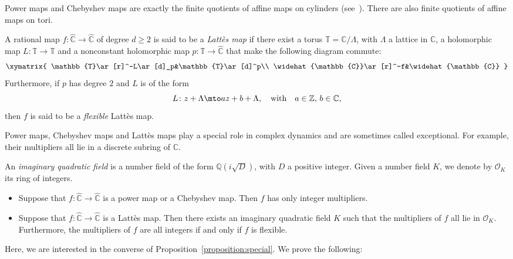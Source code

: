 Power maps and Chebyshev maps are exactly the finite quotients of affine maps on cylinders (see~\cite[Lem.\,3.8]{M2006}). There are also finite quotients of affine maps on tori.

\begin{definition}
A rational map $f \colon \widehat{\mathbb{C}} \to \widehat{\mathbb{C}}$ of degree $d \geq 2$ is said to be a \emph{Lattès map} if there exist a torus $\mathbb{T} = \mathbb{C}/\Lambda$, with $\Lambda$ a lattice in $\mathbb{C}$, a holomorphic map $L \colon \mathbb{T} \to \mathbb{T}$ and a nonconstant holomorphic map $p \colon \mathbb{T} \to \widehat{\mathbb{C}}$ that make the following diagram commute:
\[
\xymatrix{
\mathbb{T}\ar[r]^-L\ar[d]_p&\mathbb{T}\ar[d]^p\\
\widehat{\mathbb{C}}\ar[r]^-f&\widehat{\mathbb{C}}
}
\]
Furthermore, if $p$ has degree $2$ and $L$ is of the form
\[
L \colon z +\Lambda \mto a z +b +\Lambda, \quad \text{with} \quad a \in \mathbb{Z}, \, b \in \mathbb{C},
\]
then $f$ is said to be a \emph{flexible} Lattès map.
\end{definition}

Power maps, Chebyshev maps and Lattès maps play a special role in complex dynamics and are sometimes called exceptional. For example, their multipliers all lie in a discrete subring of $\mathbb{C}$.

An \emph{imaginary quadratic field} is a number field of the form $\mathbb{Q}(i \sqrt{D})$, with $D$ a positive integer. Given a number field $K$, we denote by $\mathcal{O}_{K}$ its ring of integers.

\skpt
\begin{proposition}
\label{proposition:special}
\begin{itemize}
\item Suppose that $f \colon \widehat{\mathbb{C}} \to \widehat{\mathbb{C}}$ is a power map or a Chebyshev map. Then $f$ has only integer multipliers.
\item Suppose that $f \colon \widehat{\mathbb{C}} \to \widehat{\mathbb{C}}$ is a Lattès map. Then there exists an imaginary quadratic field $K$ such that the multipliers of $f$ all lie in $\mathcal{O}_{K}$. Furthermore, the multipliers of $f$ are all integers if and only if $f$ is flexible.
\end{itemize}
\end{proposition}

Here, we are interested in the converse of Proposition~\ref{proposition:special}. We prove the following:

